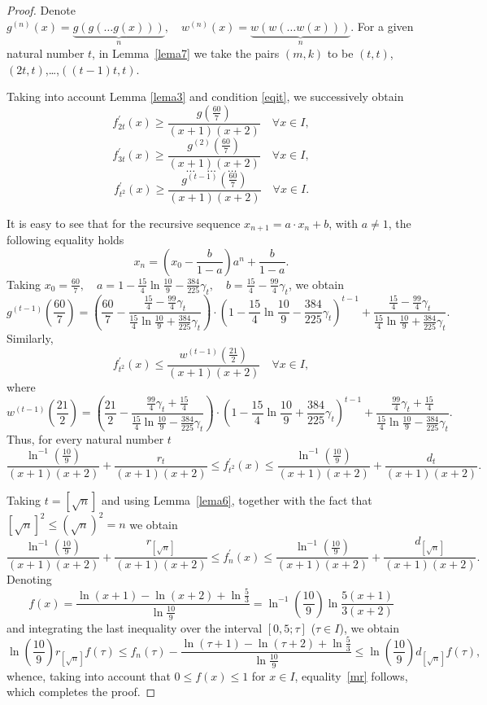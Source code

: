 \documentclass[11pt]{amsart}
\theoremstyle{plain}
\theoremstyle{remark}
\begin{document}
\begin{proof}
Denote $g^{(n)}(x)=\underbrace{g(g(\ldots g(x)))}_{n},\quad w^{(n)}(x)=\underbrace{w(w(\ldots w(x)))}_{n}.
$
For a given natural number $t$, in Lemma~\ref{lema7} we take the pairs $(m,k)$ to be $(t,t)$,$(2t,t)$,\ldots,$((t-1)t,t).$

Taking into account Lemma \ref{lema3} and condition \eqref{eqit}, we successively obtain
$$
f_{2t}^\prime(x)\geq\frac{g(\frac{60}{7})}{(x+1)(x+2)} \quad \forall x\in I,
$$
$$
f_{3t}^\prime(x)\geq\frac{g^{(2)}(\frac{60}{7})}{(x+1)(x+2)} \quad \forall x\in I,
$$
$$
\ldots \quad \ldots \quad \ldots
$$
$$
f_{t^2}^\prime(x)\geq\frac{g^{(t-1)}(\frac{60}{7})}{(x+1)(x+2)} \quad \forall x\in I.
$$

It is easy to see that for the recursive sequence $x_{n+1}=a\cdot x_n+b$, with $a\neq1$, the following equality holds 
$$
x_n=\left(x_0-\frac{b}{1-a}\right)a^n+\frac{b}{1-a}.
$$
Taking $x_{0}=\frac{60}{7}, \quad a=1-\frac{15}{4}\ln\frac{10}{9}-\frac{384}{225}\gamma_t,  \quad b=\frac{15}{4}-\frac{99}{4}\gamma_t$, we obtain
$$
g^{(t-1)}(\frac{60}{7})=\left(\frac{60}{7}-\frac{\frac{15}{4}-\frac{99}{4}\gamma_t}{\frac{15}{4}
\ln\frac{10}{9}+\frac{384}{225}\gamma_t}\right)\cdot \left(1-\frac{15}{4}\ln\frac{10}{9}-\frac{384}{225}\gamma_t\right)^{t-1}+
\frac{\frac{15}{4}-\frac{99}{4}\gamma_t}{\frac{15}{4}\ln\frac{10}{9}+\frac{384}{225}\gamma_t}.
$$
Similarly,
$$
f_{t^2}^\prime(x)\leq\frac{w^{(t-1)}(\frac{21}{2})}{(x+1)(x+2)} \quad \forall x\in I,
$$
where
$$
w^{(t-1)}(\frac{21}{2})=\left(\frac{21}{2}-\frac{\frac{99}{4}\gamma_t+
\frac{15}{4}}{\frac{15}{4}\ln\frac{10}{9}-\frac{384}{225}\gamma_t}\right)\cdot \left(1-\frac{15}{4}\ln\frac{10}{9}+\frac{384}{225}\gamma_t\right)^{t-1}+
 \frac{\frac{99}{4}\gamma_{t}+\frac{15}{4}}{\frac{15}{4}\ln\frac{10}{9}-\frac{384}{225}\gamma_t}.
$$
Thus, for every natural number $t$
$$
\frac{\ln^{-1}\left(\frac{10}{9}\right)}{(x+1)(x+2)}+\frac{r_t}{(x+1)(x+2)}\leq f_{t^2}^\prime(x)\leq\frac{\ln^{-1}\left(\frac{10}{9}\right)}{(x+1)(x+2)}+\frac{d_t}{(x+1)(x+2)}.
$$

Taking $t=[\sqrt{n} ]$ and using Lemma~\eqref{lema6}, together with the fact that $[\sqrt{n}]^2\leq(\sqrt{n})^2=n$ we obtain
$$
\frac{\ln^{-1}\left(\frac{10}{9}\right)}{(x+1)(x+2)}+\frac{r_{[\sqrt{n}]}}{(x+1)(x+2)}\leq f_{n}^\prime(x)\leq\frac{\ln^{-1}\left(\frac{10}{9}\right)}{(x+1)(x+2)}+\frac{d_{[\sqrt{n}]}}{(x+1)(x+2)}.
$$
Denoting
$$f(x)=\frac{\ln\left(x+1\right)-\ln\left(x+2\right)+\ln\frac{5}{3}}{\ln\frac{10}{9}}=
\ln^{-1}\left(\frac{10}{9}\right)\ln\frac{5(x+1)}{3(x+2)}$$
and integrating the last inequality over the interval $[0,5;\tau]$ ($\tau \in I$), we obtain
 $$
\ln\left(\frac{10}{9}\right)r_{[\sqrt{n}]}f(\tau)\leq f_n(\tau)-\frac{\ln\left(\tau+1\right)-\ln\left(\tau+2\right)+\ln\frac{5}{3}}{\ln\frac{10}{9}}\leq\ln\left(\frac{10}{9}\right)
d_{[\sqrt{n}]}f(\tau),
$$
whence, taking into account that $0\leq f(x)\leq 1$ for  $x\in I$, equality~\eqref{mr} follows, which completes the proof.
\end{proof}
\end{document}

